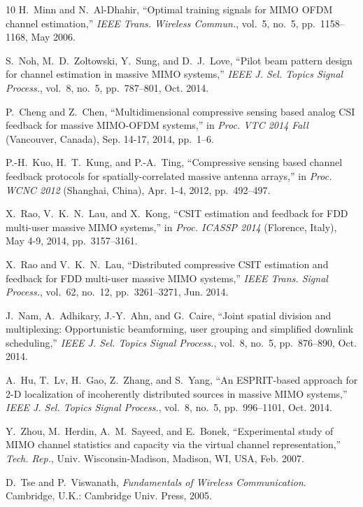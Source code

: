 \documentclass[final]{IEEEtran}
\begin{document}
\begin{thebibliography}{10}
 H.~Minn and N.~Al-Dhahir, ``Optimal training signals for MIMO OFDM channel estimation,''
 {\em IEEE Trans. Wireless Commun.}, vol.~5, no.~5, pp.~1158--1168, May 2006.

 S.~Noh, M.~D.~Zoltowski, Y.~Sung, and D.~J.~Love, ``Pilot beam pattern design for
 channel estimation in massive MIMO systems,'' {\em IEEE J. Sel. Topics Signal Process.},
 vol.~8, no.~5, pp.~787--801, Oct. 2014.

 P.~Cheng and Z.~Chen, ``Multidimensional compressive sensing based analog CSI feedback
 for massive MIMO-OFDM systems,'' in {\em Proc. VTC 2014 Fall} (Vancouver, Canada),
 Sep. 14-17, 2014, pp.~1--6.

 P.-H.~Kuo, H.~T.~Kung, and P.-A.~Ting, ``Compressive sensing based channel feedback
 protocols for spatially-correlated massive antenna arrays,'' in {\em Proc. WCNC 2012}
 (Shanghai, China),  Apr. 1-4, 2012, pp.~492--497.

 X.~Rao, V.~K.~N.~Lau, and X.~Kong, ``CSIT estimation and feedback for FDD multi-user
 massive MIMO systems,'' in {\it Proc. ICASSP 2014} (Florence, Italy), May 4-9, 2014,
 pp.~3157--3161.

 X.~Rao and V.~K.~N.~Lau, ``Distributed compressive CSIT estimation and feedback for FDD
 multi-user massive MIMO systems,'' \emph{IEEE Trans. Signal Process.}, vol.~62, no.~12,
 pp.~3261--3271, Jun. 2014.

 J.~Nam, A.~Adhikary, J.-Y.~Ahn, and G.~Caire, ``Joint spatial division and multiplexing:
 Opportunistic beamforming, user grouping and simplified downlink scheduling,''
 {\em IEEE J. Sel. Topics Signal Process.}, vol.~8, no.~5, pp.~876--890, Oct. 2014.

 A.~Hu, T.~Lv, H.~Gao, Z.~Zhang, and S.~Yang, ``An ESPRIT-based approach for 2-D localization
 of incoherently distributed sources in massive MIMO systems,'' {\em IEEE J. Sel. Topics
 Signal Process.}, vol.~8, no.~5, pp.~996--1101, Oct. 2014.

 Y.~Zhou, M.~Herdin, A.~M.~Sayeed, and E.~Bonek, ``Experimental study of MIMO channel
 statistics and capacity via the virtual channel representation,'' \emph{Tech. Rep.},
 Univ. Wisconsin-Madison, Madison, WI, USA, Feb. 2007.

 D.~Tse and P.~Viswanath, {\em Fundamentals of Wireless Communication}. Cambridge, U.K.:
 Cambridge Univ. Press, 2005.


\end{thebibliography}
\end{document}
